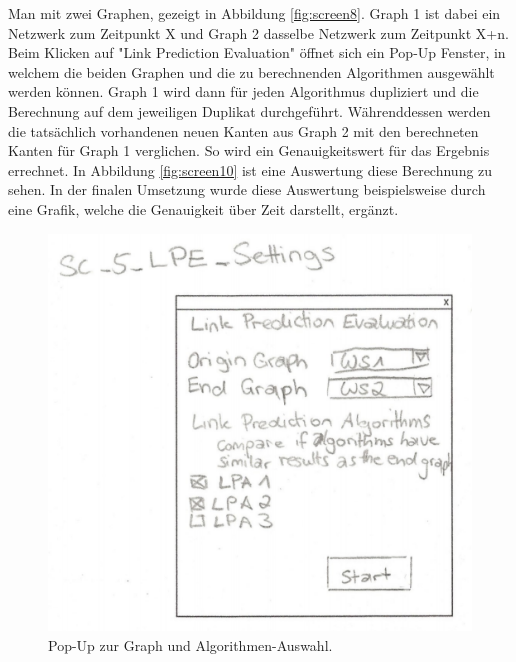 Man mit zwei Graphen, gezeigt in Abbildung \ref{fig:screen8}. Graph 1 ist dabei ein Netzwerk zum Zeitpunkt X und Graph 2
dasselbe Netzwerk zum Zeitpunkt X+n. Beim Klicken auf "Link Prediction Evaluation" öffnet sich ein Pop-Up Fenster, in
welchem die beiden Graphen und die zu berechnenden Algorithmen ausgewählt werden können. Graph 1 wird dann für jeden
Algorithmus dupliziert und die Berechnung auf dem jeweiligen Duplikat durchgeführt. Währenddessen werden die tatsächlich
vorhandenen neuen Kanten aus Graph 2 mit den berechneten Kanten für Graph 1 verglichen. So wird ein Genauigkeitswert für
das Ergebnis errechnet. In Abbildung \ref{fig:screen10} ist eine Auswertung diese Berechnung zu sehen. In der finalen
Umsetzung wurde diese Auswertung beispielsweise durch eine Grafik, welche die Genauigkeit über Zeit darstellt, ergänzt.

\begin{figure}
    \includegraphics[width=\linewidth]{resources/EV-3.png}
    \caption{Pop-Up zur Graph und Algorithmen-Auswahl.}
    \label{fig:screen9}
\end{figure}

